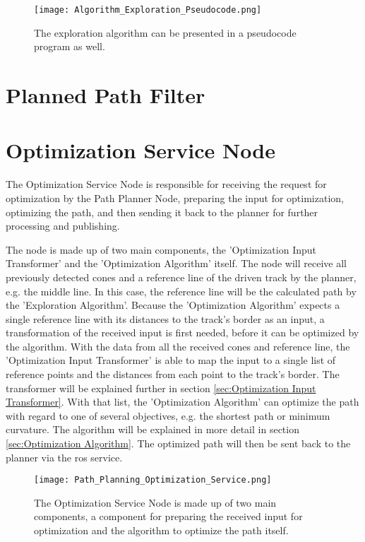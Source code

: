 \begin{figure}[H]
    \centering
    \texttt{[image: Algorithm\_Exploration\_Pseudocode.png]}
    \caption{The exploration algorithm can be presented in a pseudocode program as well.}
    \label{fig:Algorithm Exploration Pseudocode}
\end{figure}

\section{Planned Path Filter} \label{sec:Planned Path Filter}
\lipsum[1]

\section{Optimization Service Node} \label{sec:Optimization Service Node}
The Optimization Service Node is responsible for receiving the request for optimization by the Path Planner Node, preparing the input for optimization, optimizing the path, and then sending it back to the planner for further processing and publishing.

The node is made up of two main components, the 'Optimization Input Transformer' and the 'Optimization Algorithm' itself. The node will receive all previously detected cones and a reference line of the driven track by the planner, e.g. the middle line. In this case, the reference line will be the calculated path by the 'Exploration Algorithm'. Because the 'Optimization Algorithm' expects a single reference line with its distances to the track's border as an input, a transformation of the received input is first needed, before it can be optimized by the algorithm. With the data from all the received cones and reference line, the 'Optimization Input Transformer' is able to map the input to a single list of reference points and the distances from each point to the track's border. The transformer will be explained further in section \ref{sec:Optimization Input Transformer}. With that list, the 'Optimization Algorithm' can optimize the path with regard to one of several objectives, e.g. the shortest path or minimum curvature. The algorithm will be explained in more detail in section \ref{sec:Optimization Algorithm}. The optimized path will then be sent back to the planner via the  \acrshort{ros} service.
\begin{figure}[H]
    \centering
    \texttt{[image: Path\_Planning\_Optimization\_Service.png]}
    \caption{The Optimization Service Node is made up of two main components, a component for preparing the received input for optimization and the algorithm to optimize the path itself.}
    \label{fig:Path Planning Optimization Service Node}
\end{figure}

